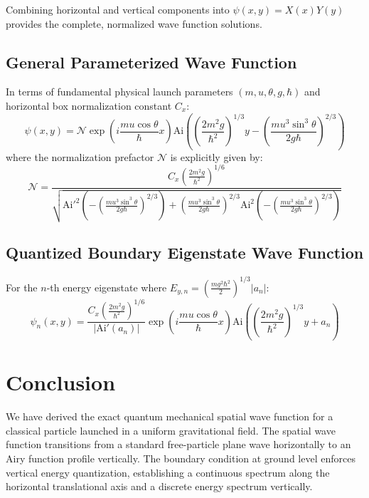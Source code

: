 \documentclass[11pt, a4paper]{article}
\begin{document}
Combining horizontal and vertical components into $\psi(x,y) = X(x)Y(y)$ provides the complete, normalized wave function solutions.

\subsection{General Parameterized Wave Function}
In terms of fundamental physical launch parameters $(m, u, \theta, g, \hbar)$ and horizontal box normalization constant $C_x$:
\begin{equation}
\psi(x, y) = \mathcal{N} \exp\left( i \frac{m u \cos\theta}{\hbar} x \right) \text{Ai}\left( \left( \frac{2 m^2 g}{\hbar^2} \right)^{1/3} y - \left( \frac{m u^3 \sin^3\theta}{2 g \hbar} \right)^{2/3} \right)
\end{equation}
where the normalization prefactor $\mathcal{N}$ is explicitly given by:
\begin{equation}
\mathcal{N} = \frac{C_x \left( \frac{2 m^2 g}{\hbar^2} \right)^{1/6}}{\sqrt{\text{Ai}'^2\left(-\left( \frac{m u^3 \sin^3\theta}{2 g \hbar} \right)^{2/3}\right) + \left( \frac{m u^3 \sin^3\theta}{2 g \hbar} \right)^{2/3} \text{Ai}^2\left(-\left( \frac{m u^3 \sin^3\theta}{2 g \hbar} \right)^{2/3}\right)}}
\end{equation}

\subsection{Quantized Boundary Eigenstate Wave Function}
For the $n$-th energy eigenstate where $E_{y,n} = \left(\frac{m g^2 \hbar^2}{2}\right)^{1/3} |a_n|$:
\begin{equation}
\psi_n(x, y) = \frac{C_x \left( \frac{2 m^2 g}{\hbar^2} \right)^{1/6}}{|\text{Ai}'(a_n)|} \exp\left( i \frac{m u \cos\theta}{\hbar} x \right) \text{Ai}\left( \left( \frac{2 m^2 g}{\hbar^2} \right)^{1/3} y + a_n \right)
\end{equation}

\section{Conclusion}

We have derived the exact quantum mechanical spatial wave function for a classical particle launched in a uniform gravitational field. The spatial wave function transitions from a standard free-particle plane wave horizontally to an Airy function profile vertically. The boundary condition at ground level enforces vertical energy quantization, establishing a continuous spectrum along the horizontal translational axis and a discrete energy spectrum vertically.
\end{document}
